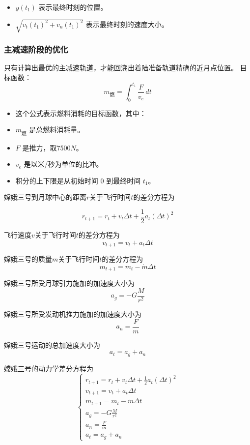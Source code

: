 \documentclass{ctexart}
\begin{document}
\begin{itemize}
    \renewcommand\labelitemi{} %
    \item $y(t_1)$ 表示最终时刻的位置。
    \item $\sqrt{v_t(t_1)^2 + v_n(t_1)^2}$ 表示最终时刻的速度大小。
\end{itemize}

	\subsubsection{主减速阶段的优化}
只有计算出最优的主减速轨道，才能回溯出着陆准备轨道精确的近月点位置。
目标函数：
\begin{equation}
m_{\text{燃}} = \int_0^{t_1} \frac{F}{v_e} \, dt
\end{equation}

\begin{itemize}
    \renewcommand\labelitemi{} %
    \item 这个公式表示燃料消耗的目标函数，其中：
    \item $m_{\text{燃}}$ 是总燃料消耗量。
    \item $F$ 是推力，取7500\(N\)。
    \item $v_e$ 是以米/秒为单位的比冲。
    \item 积分的上下限是从初始时间 $0$ 到最终时间 $t_1$。
\end{itemize}

嫦娥三号到月球中心的距离\(r\)关于飞行时间\(t\)的差分方程为

\[r_{t+1} = r_t + v_t \Delta t + \frac{1}{2} a_t (\Delta t)^2\]

飞行速度\(v\)关于飞行时间\(t\)的差分方程为
\[v_{t+1} = v_t + a_t \Delta t\]

嫦娥三号的质量\(m\)关于飞行时间\(t\)的差分方程为
\[m_{t+1} = m_t - \dot{m} \Delta t\]

嫦娥三号所受月球引力施加的加速度大小为
\[a_g = - G \frac{M}{r^2}\]

嫦娥三号所受发动机推力施加的加速度大小为
\[a_n = \frac{F}{m}\]

嫦娥三号运动的总加速度大小为
\[a_t = a_g + a_n\]

嫦娥三号的动力学差分方程为
\[
\begin{cases}
r_{t+1} = r_t + v_t \Delta t + \frac{1}{2} a_t (\Delta t)^2 \\
v_{t+1} = v_t + a_t \Delta t \\
m_{t+1} = m_t - \dot{m} \Delta t \\
a_g = - G \frac{M}{r^2} \\
a_n = \frac{F}{m} \\
a_t = a_g + a_n
\end{cases}
\]
\end{document}

